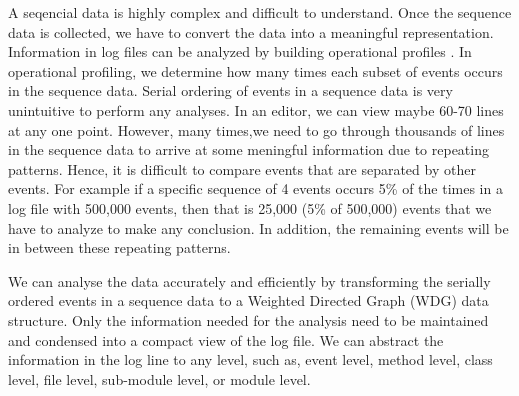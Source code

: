 
A seqencial data is highly complex and difficult to understand. Once the sequence data is collected, we have to convert the data into a meaningful representation. Information in log files can be analyzed by building operational profiles \cite{hmf08}\cite{nwv09}. In operational profiling, we determine how many times each subset of events occurs in the sequence data. Serial ordering of events in a sequence data is very unintuitive to perform any analyses. In an editor, we can view maybe 60-70 lines at any one point. However, many times,we need to go through thousands of lines in the sequence data to arrive at some meningful information due to repeating patterns. Hence, it is difficult to compare events that are separated by other events. For example if a specific sequence of 4 events occurs 5\% of the times in a log file with 500,000 events, then that is 25,000 (5\% of 500,000) events that we have to analyze to make any conclusion. In addition, the remaining events will be in between these repeating patterns.

We can analyse the data accurately and efficiently by transforming the serially ordered events in a sequence data to a Weighted Directed Graph (WDG) data structure. Only the information needed for the analysis need to be maintained and condensed into a compact view of the log file. We can abstract the information in the log line to any level, such as, event level, method level, class level, file level, sub-module level, or module level.

